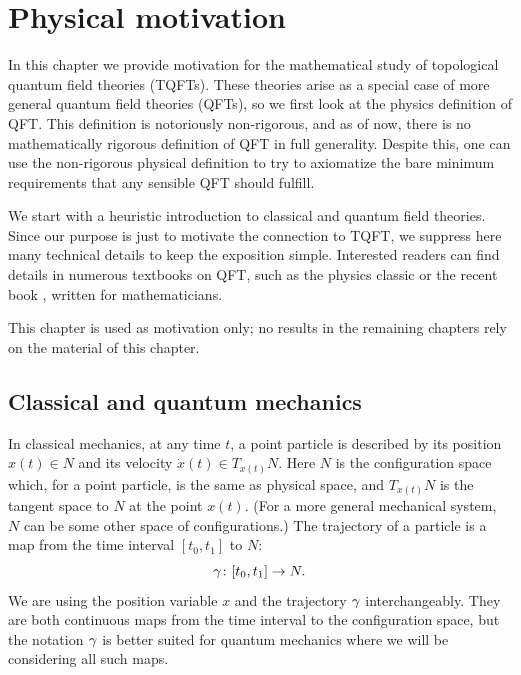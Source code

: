 \chapter{Physical motivation}\label{c:physical-motivation}
In this chapter we provide motivation for the mathematical study of topological
quantum field theories (TQFTs). These theories arise as a special case of more
general quantum field theories (QFTs), so we first look at the physics
definition of QFT. This definition is notoriously non-rigorous, and as of now,
there is no mathematically rigorous definition of QFT in full generality.
Despite this, one can use the non-rigorous physical definition to try to
axiomatize the bare minimum requirements that any sensible QFT should fulfill.

We start with a heuristic introduction to classical and quantum field theories.
Since our purpose is just to motivate the connection to TQFT, we suppress here
many technical details to keep the exposition simple. Interested readers can
find details in numerous textbooks on QFT, such as the physics classic
 or the recent book ,
written for mathematicians.

This chapter is used as motivation only; no results in the remaining
chapters rely on the material of this chapter.


\section{Classical and quantum mechanics}\label{s:mechanics}

In classical mechanics, at any time $t$, a point particle is described by its
position $x(t) \in N$ and its velocity $\dot x(t) \in T_{x(t)}N$. Here $N$ is
the configuration space which, for a point particle, is the same as physical
space, and $T_{x(t)}N$ is the tangent space to $N$ at the point $x(t)$.
(For a more general mechanical system, $N$ can be some other space of
configurations.)
The trajectory of a particle is a map from the
time interval $[t_0,t_1]$ to $N$:
\begin{equation}
	\gamma\colon[t_0,t_1] \rightarrow N. \nonumber
\end{equation}
We are using the position variable $x$ and the trajectory $\gamma$
interchangeably. They are both continuous maps from the time interval to the
configuration space, but the notation $\gamma$ is better suited for quantum
mechanics where we will be considering all such maps.

